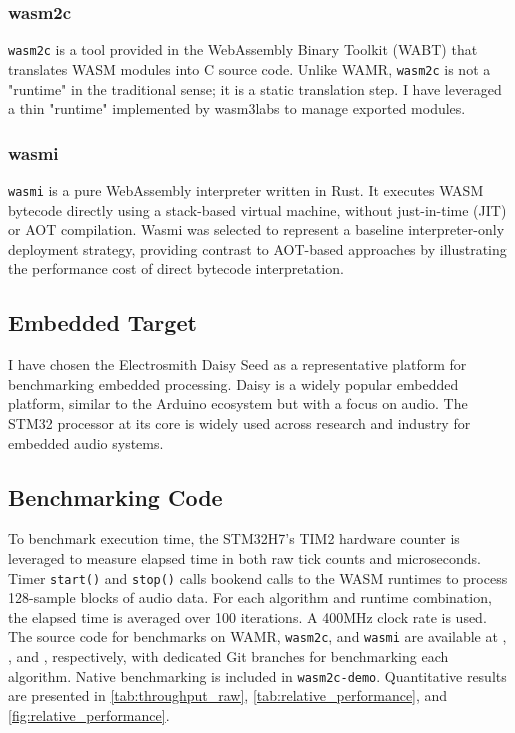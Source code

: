 \documentclass[a4paper]{article}
\begin{document}
\subsubsection{ wasm2c }

\lstinline{wasm2c} is a tool provided in the WebAssembly Binary Toolkit (WABT)\cite{wabt-repo} that translates WASM modules into C source code. Unlike WAMR, \lstinline{wasm2c} is not a "runtime" in the traditional sense; it is a static translation step. I have leveraged a thin "runtime" implemented by wasm3labs\cite{embedded-wasm-apps_repo} to manage exported modules. 


\subsubsection{ wasmi }

\lstinline{wasmi}\cite{wasmi} is a pure WebAssembly interpreter written in Rust. It executes WASM bytecode directly using a stack-based virtual machine, without just-in-time (JIT) or AOT compilation. Wasmi was selected to represent a baseline interpreter-only deployment strategy, providing contrast to AOT-based approaches by illustrating the performance cost of direct bytecode interpretation.

\subsection { Embedded Target } 

I have chosen the Electrosmith Daisy Seed as a representative platform for benchmarking embedded processing. Daisy is a widely popular embedded platform, similar to the Arduino\cite{arduino} ecosystem but with a focus on audio. The STM32 processor at its core is widely used across research and industry for embedded audio systems\cite{emilyharpist}\cite{diamond2025memorylane}\cite{jongsataporn2025embedded}.

\subsection { Benchmarking Code } 

To benchmark execution time, the STM32H7's TIM2 hardware counter is leveraged to measure elapsed time in both raw tick counts and microseconds. Timer \lstinline{start()} and \lstinline{stop()} calls bookend calls to the WASM runtimes to process 128-sample blocks of audio data. For each algorithm and runtime combination, the elapsed time is averaged over 100 iterations. A 400MHz clock rate is used. The source code for benchmarks on WAMR, \lstinline{wasm2c}, and \lstinline{wasmi} are available at \cite{wamrRepo}, \cite{wasm2cRepo}, and \cite{wasmiRepo}, respectively, with dedicated Git branches for benchmarking each algorithm. Native benchmarking is included in \lstinline{wasm2c-demo}. Quantitative results are presented in \autoref{tab:throughput_raw}, \autoref{tab:relative_performance}, and \autoref{fig:relative_performance}.
\end{document}
